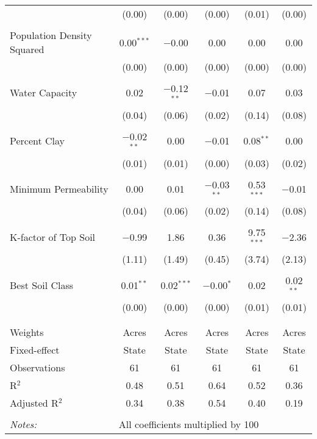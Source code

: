 \documentclass[10pt]{article}
\begin{document}
\begin{table}[!htbp]
\begin{tabular}{@{\extracolsep{5pt}}lccccc}
  & (0.00) & (0.00) & (0.00) & (0.01) & (0.00) \\ 
  & & & & & \\ 
 Population Density Squared & 0.00$^{***}$ & $-$0.00 & 0.00 & 0.00 & 0.00 \\ 
  & (0.00) & (0.00) & (0.00) & (0.00) & (0.00) \\ 
  & & & & & \\ 
 Water Capacity & 0.02 & $-$0.12$^{**}$ & $-$0.01 & 0.07 & 0.03 \\ 
  & (0.04) & (0.06) & (0.02) & (0.14) & (0.08) \\ 
  & & & & & \\ 
 Percent Clay & $-$0.02$^{**}$ & 0.00 & $-$0.01 & 0.08$^{**}$ & 0.00 \\ 
  & (0.01) & (0.01) & (0.00) & (0.03) & (0.02) \\ 
  & & & & & \\ 
 Minimum Permeability & 0.00 & 0.01 & $-$0.03$^{**}$ & 0.53$^{***}$ & $-$0.01 \\ 
  & (0.04) & (0.06) & (0.02) & (0.14) & (0.08) \\ 
  & & & & & \\ 
 K-factor of Top Soil & $-$0.99 & 1.86 & 0.36 & 9.75$^{***}$ & $-$2.36 \\ 
  & (1.11) & (1.49) & (0.45) & (3.74) & (2.13) \\ 
  & & & & & \\ 
 Best Soil Class & 0.01$^{**}$ & 0.02$^{***}$ & $-$0.00$^{*}$ & 0.02 & 0.02$^{**}$ \\ 
  & (0.00) & (0.00) & (0.00) & (0.01) & (0.01) \\ 
  & & & & & \\ 
\hline \\[-1.8ex] 
Weights & Acres & Acres & Acres & Acres & Acres \\ 
Fixed-effect & State & State & State & State & State \\ 
Observations & 61 & 61 & 61 & 61 & 61 \\ 
R$^{2}$ & 0.48 & 0.51 & 0.64 & 0.52 & 0.36 \\ 
Adjusted R$^{2}$ & 0.34 & 0.38 & 0.54 & 0.40 & 0.19 \\ 
\hline 
\hline \\[-1.8ex] 
\textit{Notes:} & \multicolumn{5}{l}{All coefficients multiplied by 100} \\ 
\end{tabular} 
\end{table} 
\end{document}
